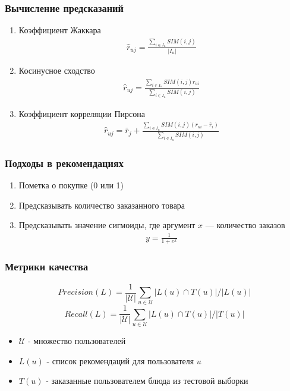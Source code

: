 \documentclass[10pt, unicode]{beamer}
\begin{document}
\begin{frame}
  \frametitle{Вычисление предсказаний}
  \begin{enumerate}
    \item Коэффициент Жаккара
    \begin{align*}
      \hat{r}_{uj} = \frac{\sum_{i \in I_u} SIM(i,j)}{|I_u|}
    \end{align*}
    \item Косинусное сходство
    \begin{align*}
      \hat{r}_{uj} = \frac{\sum_{i \in I_u} SIM(i,j) r_{ui} }{\sum_{i \in I_u} SIM(i,j)}
    \end{align*}
    \item Коэффициент корреляции Пирсона
    \begin{align*}
      \hat{r}_{uj} = \bar{r}_j + \frac{\sum_{i \in I_u} SIM(i,j) (r_{ui} - \bar{r}_i) }{\sum_{i \in I_u} SIM(i,j)}
    \end{align*}
  \end{enumerate}
\end{frame}

\begin{frame}
  \frametitle{Подходы в рекомендациях}
  \begin{enumerate}
    \item Пометка о покупке (0 или 1)
    \item Предсказывать количество заказанного товара
    \item Предсказывать значение сигмоиды, где аргумент $x$ --- количество заказов
    \begin{align*}
      y = \frac{1}{1 + e^x}
    \end{align*}
  \end{enumerate}
\end{frame}

\begin{frame}
  \frametitle{Метрики качества}
  \begin{equation}
    Precision(L) = \frac{1}{|\mathcal{U}|} \sum_{u \in \mathcal{U}} |L(u) \cap T(u)| / |L(u)|
  \end{equation}
  \begin{equation}
    Recall(L) = \frac{1}{|\mathcal{U}|} \sum_{u \in \mathcal{U}} |L(u) \cap T(u)| / |T(u)|
  \end{equation}
  \begin{itemize}
    \item $\mathcal{U}$ - множество пользователей
    \item $L(u)$ - список рекомендаций для пользователя $u$
    \item $T(u)$ - заказанные пользователем блюда из тестовой выборки
  \end{itemize}
\end{frame}
\end{document}
